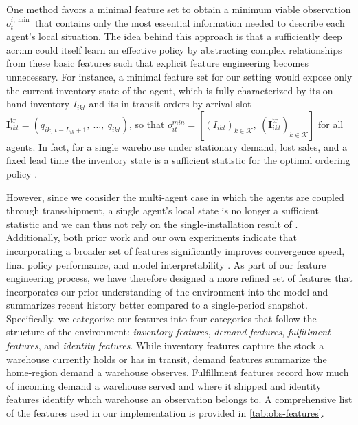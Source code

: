 One method favors a minimal feature set to obtain a minimum viable observation $o^{i,\min}_t$ that contains only the most essential information needed to describe each agent's local situation. The idea behind this approach is that a sufficiently deep \gls{acr:nn} could itself learn an effective policy by abstracting complex relationships from these basic features such that explicit feature engineering becomes unnecessary.
For instance, a minimal feature set for our setting would expose only the current inventory state of the agent, which is fully characterized by its on-hand inventory $I_{ikt}$ and its in-transit orders by arrival slot $\mathbf{I}^{\mathrm{tr}}_{ikt} = \left( q_{ik,\,t-L_{ik}+1},\ \dots,\ q_{ikt} \right)$, so that $ o_{it}^{min} = [ (I_{ikt})_{k \in \mathcal{K}},\ (\mathbf{I}^{\mathrm{tr}}_{ikt})_{k \in \mathcal{K}} ]$ for all agents. In fact, for a single warehouse under stationary demand, lost sales, and a fixed lead time the inventory state is a sufficient statistic for the optimal ordering policy \citep{karlin1958lostsales}.

However, since we consider the multi-agent case in which the agents are coupled through transshipment, a single agent's local state is no longer a sufficient statistic and we can thus not rely on the single-installation result of \citep{karlin1958lostsales}. Additionally, both prior work and our own experiments indicate that incorporating a broader set of features significantly improves convergence speed, final policy performance, and model interpretability \citep{Liu2018, glanois2024survey}. As part of our feature engineering process, we have therefore designed a more refined set of features that incorporates our prior understanding of the environment into the model and summarizes recent history better compared to a single-period snapshot. Specifically, we categorize our features into four categories that follow the structure of the environment: \textit{inventory features}, \textit{demand features}, \textit{fulfillment features}, and \textit{identity features}. While inventory features capture the stock a warehouse currently holds or has in transit, demand features summarize the home-region demand a warehouse observes. Fulfillment features record how much of incoming demand a warehouse served and where it shipped and identity features identify which warehouse an observation belongs to. A comprehensive list of the features used in our implementation is provided in \autoref{tab:obs-features}. 


